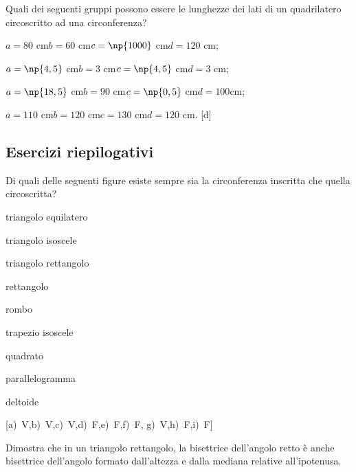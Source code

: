 \begin{esercizio}
\label{ese:5.42}
Quali dei seguenti gruppi possono essere le lunghezze dei lati di un 
quadrilatero circoscritto ad una circonferenza?
\begin{enumeratea}
\item \(a=80\) cm\quad \(b=60\) cm\quad \(c=\np{1000}\) cm\quad \(d=120\) cm;
\item \(a=\np{4,5}\) cm\quad \(b=3\) cm\quad \(c=\np{4,5}\) cm\quad \(d=3\) cm;
\item \(a=\np{18,5}\) cm\quad \(b=90\) cm\quad \(c=\np{0,5}\) cm\quad \(d=100\)cm;
\item \(a=110\) cm\quad \(b=120\) cm\quad \(c=130\) cm\quad \(d=120\) cm.
\hfill [d]
\end{enumeratea}
\end{esercizio}

\subsection{Esercizi riepilogativi}

\begin{esercizio}
\label{ese:5.43}
Di quali delle seguenti figure esiste sempre sia la circonferenza 
inscritta che quella circoscritta?
\begin{multicols}{2}
\begin{enumeratea}
\item triangolo equilatero\hfill\boxV\quad\boxF
\item triangolo isoscele\hfill\boxV\quad\boxF
\item triangolo rettangolo\hfill\boxV\quad\boxF
\item rettangolo\hfill\boxV\quad\boxF
\item rombo\hfill\boxV\quad\boxF
\item trapezio isoscele\hfill\boxV\quad\boxF
\item quadrato\hfill\boxV\quad\boxF
\item parallelogramma\hfill\boxV\quad\boxF
\item deltoide\hfill\boxV\quad\boxF
\end{enumeratea}
\end{multicols}
\hfill [a)~V,\quad b)~V,\quad c)~V,\quad d)~F,\quad e)~F,\quad f)~F,\quad 
g)~V,\quad h)~F,\quad i)~F]
\end{esercizio}

\begin{esercizio}
\label{ese:5.51}
Dimostra che in un triangolo rettangolo, la bisettrice dell'angolo 
retto è anche bisettrice dell'angolo formato dall'altezza e dalla 
mediana relative all'ipotenusa.
\end{esercizio}

